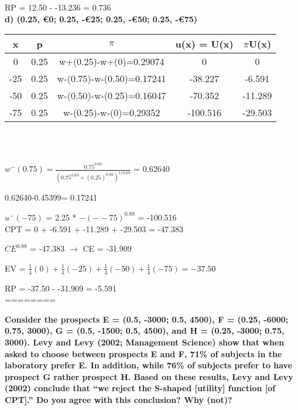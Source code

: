 \documentclass{article}
\begin{document}
RP = 12.50 - -13.236 = 0.736 \\  
 
\textbf{ d) (0.25, €0; 0.25, -€25; 0.25, -€50; 0.25, -€75)}    

\vspace{2mm}

\begin{tabular}{|c|c|c|c|c|}
	\hline
	x  & p    & $\pi$                         & u(x) = U(x) & $\pi$U(x)  \\ \hline
	0 & 0.25 & w+(0.25)-w+(0)=0.29074    & 0      & 0 \\ \hline
	-25 & 0.25 & w-(0.75)-w-(0.50)=0.17241 & -38.227     & -6.591  \\ \hline
	-50 & 0.25 & w-(0.50)-w-(0.25)=0.16047 & -70.352      & -11.289  \\ \hline
	-75  & 0.25 & w-(0.25)-w-(0)=0.29352    & -100.516           & -29.503      \\ \hline
\end{tabular} \\ \\ 

\Large

$w^-(0.75) = \frac{0.75^{0.69}}{(0.75^{0.69}+(0.25)^{0.69})^{1/0.69}}$ = 0.62640 \\

\normalsize

0.62640-0.45399= 0.17241

$u^-(-75)$ = 2.25 * $-(--75)^{0.88}$ = -100.516 \\

CPT = 0 + -6.591 + -11.289 + -29.503 = -47.383

$CE^{0.88}$ = -47.383 $\rightarrow$ CE = -31.909

\vspace{1.5mm}

EV = $\frac{1}{4}(0)+\frac{1}{4}(-25)+\frac{1}{4}(-50)+\frac{1}{4}(-75)= -37.50$

RP = -37.50 - -31.909 = -5.591 \\  

========

\textbf{Consider the prospects E = (0.5, -3000; 0.5, 4500), \linebreak F = (0.25, -6000; 0.75, 3000), G = (0.5, -1500; 0.5, 4500), and \linebreak H = (0.25, -3000; 0.75, 3000).   
Levy and Levy (2002; Management Science) show that when asked to choose between prospects E and F, 71\% of subjects in the laboratory prefer E. In addition, while 76\% of subjects prefer to have prospect G rather prospect H. Based on these results, Levy and Levy (2002) conclude that “we reject the S-shaped [utility] function [of CPT].”   
Do you agree with this conclusion? Why (not)? } \\
\end{document}
